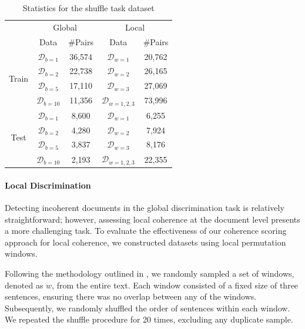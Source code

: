 \documentclass[letterpaper]{article} %
\begin{document}
\begin{table}[t!]
  \centering
  \small
  \begin{tabular}{@{}ccc|cc}
    \toprule
    & \multicolumn{2}{c|}{Global} & \multicolumn{2}{c}{Local} \\
    \cmidrule(lr){2-3} \cmidrule(lr){4-5}
    & Data & \#Pairs & Data & \#Pairs \\
    \midrule
    \multirow{4}{*}{Train} & $\mathcal{D}_{b=1}$ &  36,574 & $\mathcal{D}_{w=1}$  &20,762 \\ 
    & $\mathcal{D}_{b=2}$ & 22,738  & $\mathcal{D}_{w=2}$ &26,165  \\ 
    & $\mathcal{D}_{b=5}$ & 17,110 & $\mathcal{D}_{w=3}$ &27,069 \\ 
    & $\mathcal{D}_{b=10}$ & 11,356 & $\mathcal{D}_{w=1,2,3}$ &73,996 \\
    \midrule
    \multirow{4}{*}{Test} & $\mathcal{D}_{b=1}$ &8,600 & $\mathcal{D}_{w=1}$  &6,255 \\ 
    & $\mathcal{D}_{b=2}$ &4,280 & $\mathcal{D}_{w=2}$  &7,924 \\ 
    & $\mathcal{D}_{b=5}$ &  3,837 & $\mathcal{D}_{w=3}$ &8,176 \\ 
    & $\mathcal{D}_{b=10}$ & 2,193 & $\mathcal{D}_{w=1,2,3}$  &22,355 \\
    \bottomrule
  \end{tabular}
  \caption{Statistics for the shuffle task dataset}
  \label{datastat}
\end{table}

\paragraph{Local Discrimination}\label{exp:local} Detecting incoherent documents in the global discrimination task is relatively straightforward; however, assessing local coherence at the document level presents a more challenging task. To evaluate the effectiveness of our coherence scoring approach for local coherence, we constructed datasets using local permutation windows.

Following the methodology outlined in \citet{moon-etal-2019-unified}, we randomly sampled a set of windows, denoted as $w$, from the entire text. Each window consisted of a fixed size of three sentences, ensuring there was no overlap between any of the windows. Subsequently, we randomly shuffled the order of sentences within each window. We repeated the shuffle procedure for 20 times, excluding any duplicate sample.
\end{document}
